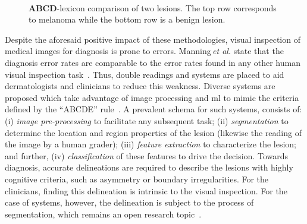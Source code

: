 \begin{figure}
\begin{center}
    \hfill
    \hfill
    \hfill
  \hspace*{\fill}\\
    \caption{\textbf{ABCD}-lexicon comparison of two lesions. The top row corresponds to melanoma while the bottom row is a benign lesion.}
  \label{fig:lexicon}
\end{center}
\end{figure}
%

Despite the aforesaid positive impact of these methodologies, visual inspection of medical images for diagnosis is prone to errors.
Manning\,\emph{et al.} state that the diagnosis error rates are comparable to the error rates found in any other human visual inspection task~\cite{manning2014perception}.
Thus, double readings and \cad systems are placed to aid dermatologists and clinicians to reduce this weakness.
Diverse \cad systems are proposed which take advantage of image processing and \ac{ml} to mimic the criteria defined by the ``ABCDE'' rule~\cite{rastgoo2015automatic}.
A prevalent schema for such \cad systems, consists of: (i) \textit{image pre-processing} to facilitate any subsequent task; (ii) \textit{segmentation} to determine the location and region properties of the lesion (likewise the reading of the image by a human grader); (iii) \textit{feature extraction} to characterize the lesion; and further, (iv) \textit{classification} of these features to drive the decision.
Towards diagnosis, accurate delineations are required to describe the lesions with highly cognitive criteria, such as asymmetry or boundary irregularities.
For the clinicians, finding this delineation is intrinsic to the visual inspection. 
For the case of \cad systems, however, the delineation is subject to the process of segmentation, which remains an open research topic~\cite{duncan2000medical}.


